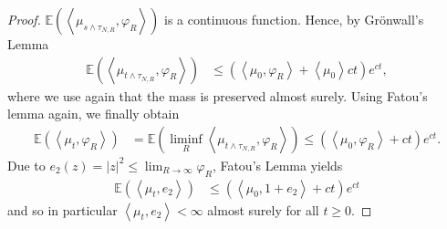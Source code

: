 \documentclass[10pt,a4paper]{amsart}
\newcommand{\E}{\mathbb{E}}
\newcommand{\av}[1]{\left<#1\right>}
\begin{document}
\begin{proof}
$\E\left( \av{\mu_{s\wedge \tau_{N,R}},\varphi_R} \right)$ is a continuous function. Hence, by Gr\"onwall's
Lemma
\begin{align*}
  \E\left( \av{\mu_{t \wedge \tau_{N,R}}, \varphi_R} \right) &\leq \left( \av{\mu_0, \varphi_R} + \av{\mu_0}ct\right)e^{ct},
\end{align*}
where we use again that the mass is preserved almost surely.  Using Fatou's lemma again, we finally
obtain
\begin{align*}
  \E\left( \av{\mu_{t},\varphi_R} \right) &= \E\left(\liminf_{R} \av{\mu_{t \wedge \tau_{N,R}},\varphi_R} \right)
                                            \leq \left( \av{\mu_0, \varphi_R} + ct\right)e^{ct}.
\end{align*}
{Due to $e_2(z) = |z|^2 \leq \lim_{R \to \infty}\varphi_R$,  Fatou's Lemma yields}
\begin{align}
  \label{est:secmombound}
  \E\left( \av{\mu_t, e_2} \right) &\leq \left( \av{\mu_0, 1+ e_2} + ct\right)e^{ct}
\end{align} 
and so in particular $\av{\mu_t, e_2} < \infty$ almost surely for all $t \geq 0$.
\end{proof}
\end{document}
